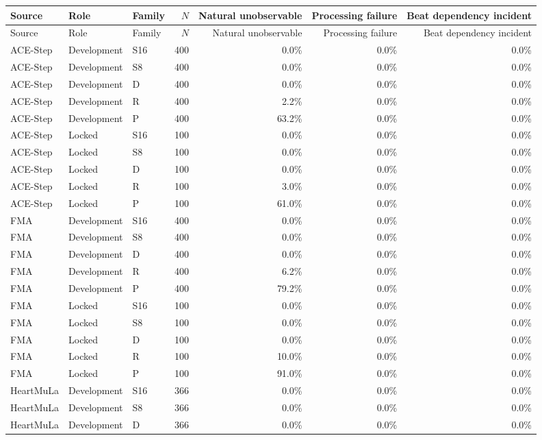 \begin{longtable}{lllrrrr}
\toprule
Source & Role & Family & $N$ & Natural unobservable & Processing failure & Beat dependency incident \\
\midrule
\endfirsthead
\toprule
Source & Role & Family & $N$ & Natural unobservable & Processing failure & Beat dependency incident \\
\midrule
\endhead
ACE-Step & Development & S16 & 400 & 0.0\% & 0.0\% & 0.0\% \\
ACE-Step & Development & S8 & 400 & 0.0\% & 0.0\% & 0.0\% \\
ACE-Step & Development & D & 400 & 0.0\% & 0.0\% & 0.0\% \\
ACE-Step & Development & R & 400 & 2.2\% & 0.0\% & 0.0\% \\
ACE-Step & Development & P & 400 & 63.2\% & 0.0\% & 0.0\% \\
ACE-Step & Locked & S16 & 100 & 0.0\% & 0.0\% & 0.0\% \\
ACE-Step & Locked & S8 & 100 & 0.0\% & 0.0\% & 0.0\% \\
ACE-Step & Locked & D & 100 & 0.0\% & 0.0\% & 0.0\% \\
ACE-Step & Locked & R & 100 & 3.0\% & 0.0\% & 0.0\% \\
ACE-Step & Locked & P & 100 & 61.0\% & 0.0\% & 0.0\% \\
FMA & Development & S16 & 400 & 0.0\% & 0.0\% & 0.0\% \\
FMA & Development & S8 & 400 & 0.0\% & 0.0\% & 0.0\% \\
FMA & Development & D & 400 & 0.0\% & 0.0\% & 0.0\% \\
FMA & Development & R & 400 & 6.2\% & 0.0\% & 0.0\% \\
FMA & Development & P & 400 & 79.2\% & 0.0\% & 0.0\% \\
FMA & Locked & S16 & 100 & 0.0\% & 0.0\% & 0.0\% \\
FMA & Locked & S8 & 100 & 0.0\% & 0.0\% & 0.0\% \\
FMA & Locked & D & 100 & 0.0\% & 0.0\% & 0.0\% \\
FMA & Locked & R & 100 & 10.0\% & 0.0\% & 0.0\% \\
FMA & Locked & P & 100 & 91.0\% & 0.0\% & 0.0\% \\
HeartMuLa & Development & S16 & 366 & 0.0\% & 0.0\% & 0.0\% \\
HeartMuLa & Development & S8 & 366 & 0.0\% & 0.0\% & 0.0\% \\
HeartMuLa & Development & D & 366 & 0.0\% & 0.0\% & 0.0\% \\

\end{longtable}
